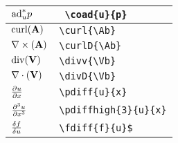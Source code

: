 \documentclass[a4paper, 12pt,twoside,plainchapterheads,yschapters, onehalfspace]{amsart}
\begin{document}
\begin{tabular}{| l | l |}
${ \mathrm{ad}^{\ast}_{u}{p} }$ & \verb| \coad{u}{p} | \\ \hline%
$\mathrm{curl}({\mathbf{A}})$ & \verb|\curl{\Ab} | \\ \hline%
$\nabla \times ({\mathbf{A}})$ & \verb|\curlD{\Ab} | \\ \hline%
${\mathrm{div}({\mathbf{V}})}$ & \verb|\divv{\Vb} | \\ \hline%
${\nabla \cdot ({\mathbf{V}})}$ & \verb|\divD{\Vb} | \\ \hline%
${\frac{\partial {u}}{\partial {x}}}$ & \verb|\pdiff{u}{x}| \\ \hline 
${\frac{\partial^{3} {u}}{\partial {x}^{3}}}$ & \verb|\pdiffhigh{3}{u}{x}| \\ \hline 
${\frac{\delta {f}}{\delta {u}}}$ & \verb|\fdiff{f}{u}$| \\ \hline 
    \end{tabular}
\end{document}
